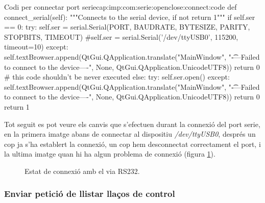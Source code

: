 \begin{code_python}{Codi per connectar port serie}{cap:imp:com:serie:openclose:connect:code}
def connect_serial(self):
        """Connects to the serial device, if not return 1"""
        if self.ser == 0:
            try:
                self.ser = serial.Serial(PORT, BAUDRATE, BYTESIZE, PARITY, STOPBITS, TIMEOUT)
                #self.ser = serial.Serial('/dev/ttyUSB0', 115200, timeout=10)
            except:
                self.textBrowser.append(QtGui.QApplication.translate("MainWindow", "\n\t----Failed to connect to the device----\n", None, QtGui.QApplication.UnicodeUTF8))
                return 0
        # this code shouldn't be never executed
        else:
            try:
                self.ser.open()
            except:
                self.textBrowser.append(QtGui.QApplication.translate("MainWindow", "\n\t----Failed to connect to the device----\n", None, QtGui.QApplication.UnicodeUTF8))
                return 0
        return 1
\end{code_python}

Tot seguit es pot veure els canvis que s'efectuen durant la connexió del port serie, en la primera imatge abans de connectar al dispositiu \emph{/dev/ttyUSB0}, després un cop ja s'ha establert la connexió, un cop hem desconnectat correctament el port, i la ultima imatge quan hi ha algun problema de connexió (figura \ref{fig:comparacio:rs232}).

\begin{figure}[ht!]
	\caption{Estat de connexió amb el \Supervisor via RS232.}
    \label{fig:comparacio:rs232}
\end{figure}

\FloatBarrier

\subsubsection{Enviar petició de llistar llaços de control}\label{cap:imp:com:serie:send:devices}

